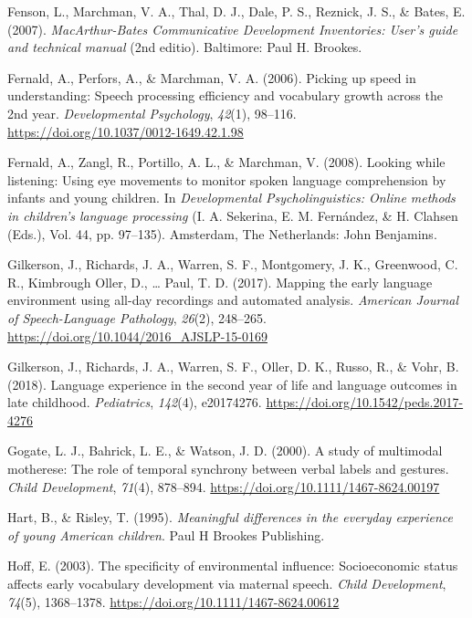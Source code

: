 \documentclass[
  english,
  man,mask]{apa6}
\begin{document}
\leavevmode\hypertarget{ref-fenson_macarthur-bates_2007}{}%
Fenson, L., Marchman, V. A., Thal, D. J., Dale, P. S., Reznick, J. S., \& Bates, E. (2007). \emph{MacArthur-Bates Communicative Development Inventories: User's guide and technical manual} (2nd editio). Baltimore: Paul H. Brookes.

\leavevmode\hypertarget{ref-fernald_picking_2006}{}%
Fernald, A., Perfors, A., \& Marchman, V. A. (2006). Picking up speed in understanding: Speech processing efficiency and vocabulary growth across the 2nd year. \emph{Developmental Psychology}, \emph{42}(1), 98--116. \url{https://doi.org/10.1037/0012-1649.42.1.98}

\leavevmode\hypertarget{ref-fernald_looking_2008}{}%
Fernald, A., Zangl, R., Portillo, A. L., \& Marchman, V. (2008). Looking while listening: Using eye movements to monitor spoken language comprehension by infants and young children. In \emph{Developmental Psycholinguistics: Online methods in children's language processing} (I. A. Sekerina, E. M. Fernández, \& H. Clahsen (Eds.), Vol. 44, pp. 97--135). Amsterdam, The Netherlands: John Benjamins.

\leavevmode\hypertarget{ref-gilkerson_mapping_2017}{}%
Gilkerson, J., Richards, J. A., Warren, S. F., Montgomery, J. K., Greenwood, C. R., Kimbrough Oller, D., \ldots{} Paul, T. D. (2017). Mapping the early language environment using all-day recordings and automated analysis. \emph{American Journal of Speech-Language Pathology}, \emph{26}(2), 248--265. \url{https://doi.org/10.1044/2016_AJSLP-15-0169}

\leavevmode\hypertarget{ref-gilkerson_language_2018}{}%
Gilkerson, J., Richards, J. A., Warren, S. F., Oller, D. K., Russo, R., \& Vohr, B. (2018). Language experience in the second year of life and language outcomes in late childhood. \emph{Pediatrics}, \emph{142}(4), e20174276. \url{https://doi.org/10.1542/peds.2017-4276}

\leavevmode\hypertarget{ref-gogate_study_2000}{}%
Gogate, L. J., Bahrick, L. E., \& Watson, J. D. (2000). A study of multimodal motherese: The role of temporal synchrony between verbal labels and gestures. \emph{Child Development}, \emph{71}(4), 878--894. \url{https://doi.org/10.1111/1467-8624.00197}

\leavevmode\hypertarget{ref-hart_meaningful_1995}{}%
Hart, B., \& Risley, T. (1995). \emph{Meaningful differences in the everyday experience of young American children}. Paul H Brookes Publishing.

\leavevmode\hypertarget{ref-hoff_specificity_2003}{}%
Hoff, E. (2003). The specificity of environmental influence: Socioeconomic status affects early vocabulary development via maternal speech. \emph{Child Development}, \emph{74}(5), 1368--1378. \url{https://doi.org/10.1111/1467-8624.00612}
\end{document}
